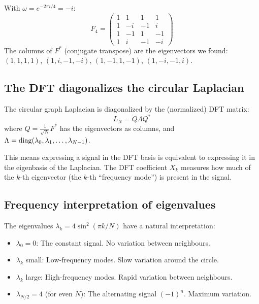 \begin{notechapter}
\begin{example}[DFT matrix for $N = 4$]
With $\omega = e^{-2\pi i/4} = -i$:
\[
F_4 = \begin{pmatrix}
1 & 1 & 1 & 1 \\
1 & -i & -1 & i \\
1 & -1 & 1 & -1 \\
1 & i & -1 & -i
\end{pmatrix}
\]
The columns of $F^*$ (conjugate transpose) are the eigenvectors we
found: $(1, 1, 1, 1)$, $(1, i, -1, -i)$, $(1, -1, 1, -1)$,
$(1, -i, -1, i)$.
\end{example}

\subsection{The DFT diagonalizes the circular Laplacian}

\begin{theorem}[Diagonalization]
The circular graph Laplacian is diagonalized by the (normalized) DFT
matrix:
\begin{equation}
L_N = Q \Lambda Q^*
\end{equation}
where $Q = \frac{1}{\sqrt{N}} F^*$ has the eigenvectors as columns,
and $\Lambda = \operatorname{diag}(\lambda_0, \lambda_1, \ldots, \lambda_{N-1})$.
\end{theorem}

This means expressing a signal in the DFT basis is equivalent to
expressing it in the eigenbasis of the Laplacian. The DFT coefficient
$X_k$ measures how much of the $k$-th eigenvector (the $k$-th
``frequency mode'') is present in the signal.

\subsection{Frequency interpretation of eigenvalues}

The eigenvalues $\lambda_k = 4\sin^2(\pi k/N)$ have a natural
interpretation:

\begin{itemize}
\item $\lambda_0 = 0$: The constant signal. No variation between
      neighbours.
\item $\lambda_k$ small: Low-frequency modes. Slow variation around
      the circle.
\item $\lambda_k$ large: High-frequency modes. Rapid variation between
      neighbours.
\item $\lambda_{N/2} = 4$ (for even $N$): The alternating signal
      $(-1)^n$. Maximum variation.
\end{itemize}


\end{notechapter}
